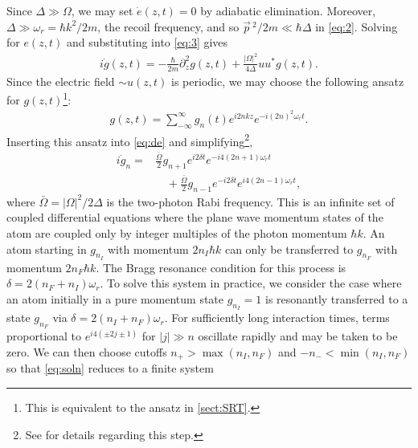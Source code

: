 \documentclass[reprint,
nofootinbib,
amsmath,amssymb,
aps]{revtex4-1}
\newcommand{\p}{\partial}
\newcommand{\f}[2]{\frac{#1}{#2}}
\newcommand{\lb}{\left[}
\newcommand{\rb}{\right]}
\begin{document}
Since $\Delta \gg \Omega$, we may set $\dot{e}(z,t) = 0$ by adiabatic elimination. Moreover, $\Delta \gg \omega_r = \hbar k^2/2m$, the recoil frequency, and so $\vec{p}\,^2/2m\ll \hbar \Delta$ in \eqref{eq:2}. Solving for $e(z,t)$ and substituting into \eqref{eq:3} gives
\begin{align}\label{eq:de}
i\dot{g}(z,t) = -\f{\hbar}{2m}\p_z^2 g(z,t) + \f{|\Omega|^2}{4\Delta} uu^* g(z,t).
\end{align}
Since the electric field $\sim u(z,t)$ is periodic, we may choose the following ansatz for $g(z,t)$\footnote{This is equivalent to the ansatz in \ref{sect:SRT}.}:
\begin{align}\label{eq:ansatz}
g(z,t) = \sum_{-\infty}^\infty g_n(t) e^{i2nkz} e^{-i(2n)^2 \omega_r t}.
\end{align}
Inserting this ansatz into \eqref{eq:de} and simplifying\footnote{See \cite{estey2016precision} for details regarding this step.},
\begin{align}\label{eq:soln}
i\dot{g}_n = &\f{\bar{\Omega}}{2} g_{n+1} e^{i2\delta t} e^{-i 4(2n+1) \omega_r t} \nonumber\\
&\quad+ \f{\bar{\Omega}}{2}g_{n-1} e^{-i2\delta t} e^{i4(2n-1)\omega_r t},
\end{align}
where $\bar{\Omega} = |\Omega|^2/2\Delta$ is the two-photon Rabi frequency. This is an infinite set of coupled differential equations where the plane wave momentum states of the atom are coupled only by integer multiples of the photon momentum $\hbar k$. An atom starting in $g_{n_I}$ with momentum $2n_I \hbar k$ can only be transferred to $g_{n_F}$ with momentum $2n_F \hbar k$. The Bragg resonance condition for this process is $\delta = 2(n_F + n_I)\omega_r$.   To solve this system in practice, we consider the case where an atom initially in a pure momentum state $g_{n_I} = 1$ is resonantly transferred to a state $g_{n_F}$ via $\delta = 2(n_I + n_F)\omega_r$. For sufficiently long interaction times, terms proportional to $e^{i4(\pm 2j \pm  1)}$ for $|j|\gg n$ oscillate rapidly and may be taken to be zero. We can then choose cutoffs $n_+ > \max(n_I, n_F)$ and $-n_- < \min(n_I, n_F)$ so that \eqref{eq:soln} reduces to a  finite system 
\end{document}
